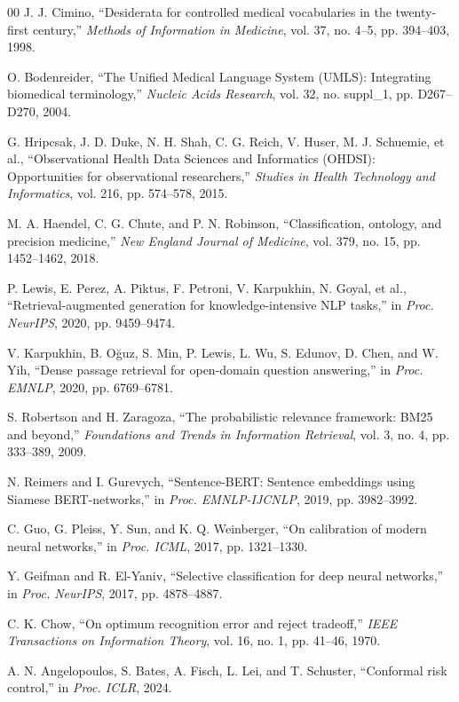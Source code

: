 \documentclass[conference]{IEEEtran}
\begin{document}
\begin{thebibliography}{00}
 J. J. Cimino, ``Desiderata for controlled medical vocabularies in the twenty-first century,'' \emph{Methods of Information in Medicine}, vol. 37, no. 4--5, pp. 394--403, 1998.

 O. Bodenreider, ``The Unified Medical Language System (UMLS): Integrating biomedical terminology,'' \emph{Nucleic Acids Research}, vol. 32, no. suppl\_1, pp. D267--D270, 2004.

 G. Hripcsak, J. D. Duke, N. H. Shah, C. G. Reich, V. Huser, M. J. Schuemie, et al., ``Observational Health Data Sciences and Informatics (OHDSI): Opportunities for observational researchers,'' \emph{Studies in Health Technology and Informatics}, vol. 216, pp. 574--578, 2015.

 M. A. Haendel, C. G. Chute, and P. N. Robinson, ``Classification, ontology, and precision medicine,'' \emph{New England Journal of Medicine}, vol. 379, no. 15, pp. 1452--1462, 2018.

 P. Lewis, E. Perez, A. Piktus, F. Petroni, V. Karpukhin, N. Goyal, et al., ``Retrieval-augmented generation for knowledge-intensive NLP tasks,'' in \emph{Proc. NeurIPS}, 2020, pp. 9459--9474.

 V. Karpukhin, B. O\u{g}uz, S. Min, P. Lewis, L. Wu, S. Edunov, D. Chen, and W. Yih, ``Dense passage retrieval for open-domain question answering,'' in \emph{Proc. EMNLP}, 2020, pp. 6769--6781.

 S. Robertson and H. Zaragoza, ``The probabilistic relevance framework: BM25 and beyond,'' \emph{Foundations and Trends in Information Retrieval}, vol. 3, no. 4, pp. 333--389, 2009.

 N. Reimers and I. Gurevych, ``Sentence-BERT: Sentence embeddings using Siamese BERT-networks,'' in \emph{Proc. EMNLP-IJCNLP}, 2019, pp. 3982--3992.

 C. Guo, G. Pleiss, Y. Sun, and K. Q. Weinberger, ``On calibration of modern neural networks,'' in \emph{Proc. ICML}, 2017, pp. 1321--1330.

 Y. Geifman and R. El-Yaniv, ``Selective classification for deep neural networks,'' in \emph{Proc. NeurIPS}, 2017, pp. 4878--4887.

 C. K. Chow, ``On optimum recognition error and reject tradeoff,'' \emph{IEEE Transactions on Information Theory}, vol. 16, no. 1, pp. 41--46, 1970.

 A. N. Angelopoulos, S. Bates, A. Fisch, L. Lei, and T. Schuster, ``Conformal risk control,'' in \emph{Proc. ICLR}, 2024.


\end{thebibliography}
\end{document}
